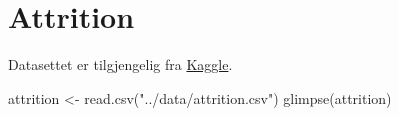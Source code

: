 \documentclass[
  letterpaper,
  DIV=11,
  numbers=noendperiod]{scrreprt}
\newenvironment{Shaded}{\begin{snugshade}}{\end{snugshade}}
\newcommand{\FunctionTok}[1]{\textcolor[rgb]{0.28,0.35,0.67}{#1}}
\newcommand{\NormalTok}[1]{\textcolor[rgb]{0.00,0.23,0.31}{#1}}
\newcommand{\OtherTok}[1]{\textcolor[rgb]{0.00,0.23,0.31}{#1}}
\newcommand{\StringTok}[1]{\textcolor[rgb]{0.13,0.47,0.30}{#1}}
\theoremstyle{definition}
\theoremstyle{remark}
\begin{document}
\hypertarget{attrition}{%
\section{Attrition}\label{attrition}}

Datasettet er tilgjengelig fra
\href{https://www.kaggle.com/datasets/pavansubhasht/ibm-hr-analytics-attrition-dataset}{Kaggle}.

\begin{Shaded}
\begin{Highlighting}[]
\NormalTok{attrition }\OtherTok{\textless{}{-}} \FunctionTok{read.csv}\NormalTok{(}\StringTok{"../data/attrition.csv"}\NormalTok{)}
\FunctionTok{glimpse}\NormalTok{(attrition)}
\end{Highlighting}
\end{Shaded}
\end{document}
